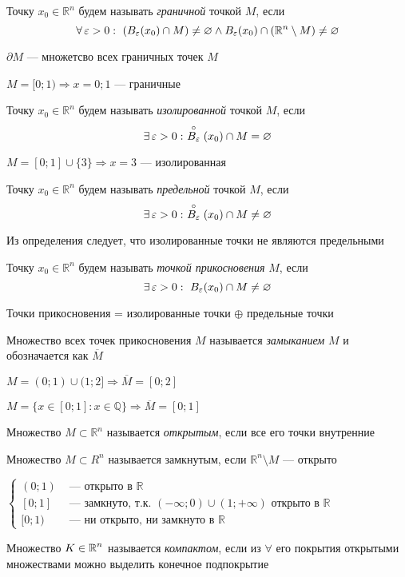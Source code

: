 \documentclass[a4paper, 10pt]{article}
\begin{document}
 Точку $x_0\in\mathbb{R}^n$ будем называть \textit{граничной} точкой $M$, если $$\forall \ve>0:\ \left(B_{\ve}(x_0)\cap M\right)\ne\varnothing\wedge B_{\ve}(x_0)\cap(\mathbb{R}^n\setminus M)\ne\varnothing$$ 

\mark $\partial M$ — множетсво всех граничных точек $M$

\ex $M=[0;1)\Longrightarrow x=0;1$ — граничные

 Точку $x_0\in\mathbb{R}^n$ будем называть \textit{изолированной} точкой $M$, если $$\exists \ve>0:\ \stackrel{\circ}{B_{\ve}}(x_0)\cap M=\varnothing$$ 

\ex $M=[0;1]\cup \{3\}\Longrightarrow x=3$ — изолированная

 Точку $x_0\in\mathbb{R}^n$ будем называть \textit{предельной} точкой $M$, если $$\exists \ve>0:\ \stackrel{\circ}{B_{\ve}}(x_0)\cap M\ne\varnothing$$ 

\comment Из определения следует, что изолированные точки не являются предельными

 Точку $x_0\in\mathbb{R}^n$ будем называть \textit{точкой прикосновения} $M$, если $$\exists \operatorname{\varepsilon}>0:\ B_{\operatorname{\varepsilon}}(x_0)\cap M\ne\varnothing$$ 

\comment Точки прикосновения = изолированные точки $\oplus$ предельные точки

 Множество всех точек прикосновения $M$ называется \textit{замыканием} $M$ и обозначается как $\overline {M}$

\ex $M=(0;1)\cup(1;2]\Longrightarrow\overline{M}=[0;2]$

\ex $M=\{x\in[0;1]\colon x\in \mathbb{Q}\}\Longrightarrow\overline{M}=[0;1]$

 Множество $M\subset\mathbb{R}^n$ называется \textit{открытым}, если все его точки внутренние

 Множество $M\subset R^n$ называется замкнутым, если $\mathbb{R}^n\setminus M$ — открыто

\ex $\begin{cases}
    (0;1)&\text{ — открыто в $\mathbb{R}$}\\
    [0;1]&\text{ — замкнуто, т.к. $(-\infty;0)\cup(1;+\infty)$ открыто в $\mathbb{R}$}\\
    [0;1)&\text{ — ни открыто, ни замкнуто в $\mathbb{R}$}
\end{cases}$

 Множество $K\in\operatorname{\mathbb{R}}^n$ называется \textit{компактом}, если из $\forall$ его покрытия открытыми множествами можно выделить конечное подпокрытие
\end{document}
